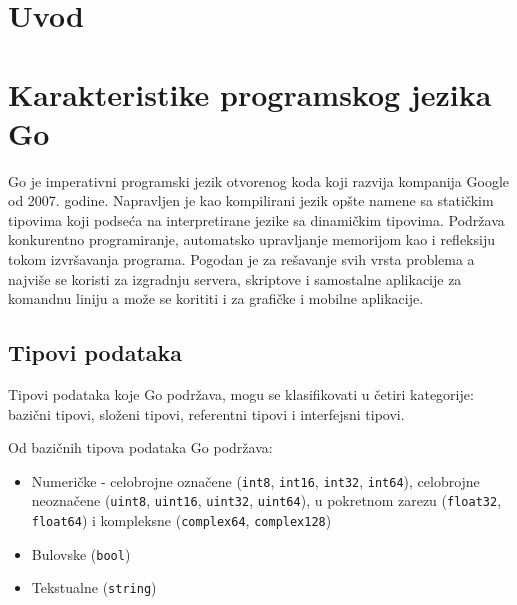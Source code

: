 \documentclass[12pt,oneside]{memoir}
\begin{document}
\frontmatter
\naslovna
\komisija
{}
\apstrakt
\tableofcontents*

\mainmatter

\chapter{Uvod}


\chapter{Karakteristike programskog jezika Go}

Go je imperativni programski jezik otvorenog koda koji razvija kompanija Google od 2007. godine. Napravljen je kao kompilirani jezik opšte namene sa statičkim tipovima koji podseća na interpretirane jezike sa dinamičkim tipovima. Podržava konkurentno programiranje, automatsko upravljanje memorijom kao i refleksiju tokom izvršavanja programa. Pogodan je za rešavanje svih vrsta problema a najviše se koristi za izgradnju servera, skriptove i samostalne aplikacije za komandnu liniju a može se korititi i za grafičke i mobilne aplikacije.

\section{Tipovi podataka}

Tipovi podataka koje Go podržava, mogu se klasifikovati u četiri kategorije: bazični tipovi, složeni tipovi, referentni tipovi i interfejsni tipovi. 

Od bazičnih tipova podataka Go podržava:
\begin{itemize}

\item Numeričke -  celobrojne označene (\texttt{int8}, \texttt{int16}, \texttt{int32}, \texttt{int64}),
 celobrojne neoznačene  (\texttt{uint8}, \texttt{uint16}, \texttt{uint32}, \texttt{uint64}), u pokretnom zarezu (\texttt{float32}, \texttt{float64}) i kompleksne (\texttt{complex64}, \texttt{complex128})

\item Bulovske  (\texttt{bool})

\item Tekstualne (\texttt{string})

\end{itemize}
\end{document}
